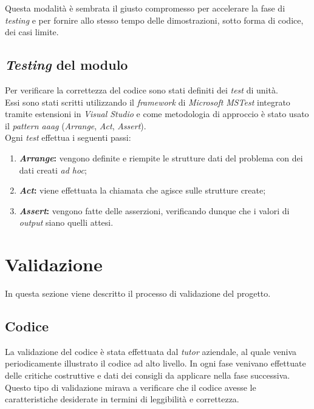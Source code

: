\noindent Questa modalità è sembrata il giusto compromesso per accelerare la
fase di \textit{testing} e per fornire allo stesso tempo delle dimostrazioni, sotto forma di
codice, dei casi limite.

\subsection{\textit{Testing} del modulo}
\noindent Per verificare la correttezza del codice sono stati definiti dei \textit{test} di unità.\\
Essi sono stati scritti utilizzando il \textit{framework} di \textit{Microsoft} \textit{MSTest} \cite{site:mstest} integrato tramite estensioni
in \textit{Visual Studio} e come metodologia di approccio è stato usato il \textit{pattern \gls{aaag}} (\textit{Arrange}, \textit{Act}, \textit{Assert}).\\
Ogni \textit{test} effettua i seguenti passi:
\begin{enumerate}
    \item \textbf{\textit{Arrange}:} vengono definite e riempite le strutture dati del problema con dei
    dati creati \textit{ad hoc};
    \item \textbf{\textit{Act}:} viene effettuata la chiamata che agisce sulle strutture create;
    \item \textbf{\textit{Assert}:} vengono fatte delle asserzioni, verificando dunque che i valori di \textit{output} 
    siano quelli attesi.
\end{enumerate}





\section{Validazione}
\noindent In questa sezione viene descritto il processo di validazione del progetto.
\subsection{Codice}
\noindent La validazione del codice è stata effettuata dal \textit{\textit{tutor}} aziendale,
al quale veniva periodicamente illustrato il codice ad alto livello.
In ogni fase venivano effettuate delle critiche costruttive e dati dei consigli
da applicare nella fase successiva. Questo tipo di validazione mirava a verificare che il codice avesse le caratteristiche desiderate in termini di leggibilità e correttezza.
